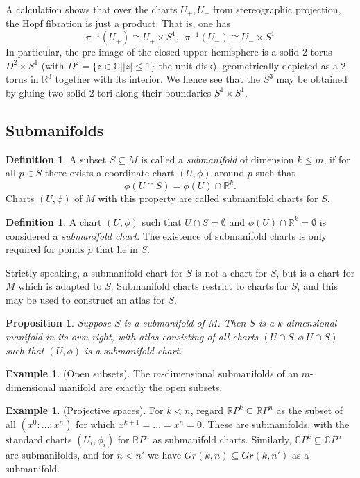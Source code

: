 \documentclass{article}
\newtheorem{proposition}{Proposition}[theorem]
\theoremstyle{definition}
\newtheorem{defn}[theorem]{Definition}
\newtheorem{example}[theorem]{Example}
\newenvironment{definition}
  {\vspace{8pt}\begin{mdframed}[backgroundcolor=blueish,innertopmargin=4]\begin{defn}}
  {\end{defn}\end{mdframed}\vspace{4pt}}
\begin{document}
A calculation shows that over the charts $U_+,U_-$ from stereographic projection, the Hopf fibration is just a product. That is, one has
\[
    \pi^{-1} (U_+) \cong U_+ \times S^1, \ \ \pi^{-1} (U_-) \cong U_- \times S^1
\]
In particular, the pre-image of the closed upper hemisphere is a solid 2-torus $D^2 \times S^1$ (with $D^2 = \{ z \in \mathbb C| |z| \leq 1 \}$ the unit disk), geometrically depicted as a 2-torus in $\mathbb R^3$ together with its interior. We hence see that the $S^3$ may be obtained by gluing two solid 2-tori along their boundaries $S^1 \times S^1$.

\subsection{Submanifolds}
\begin{definition}
A subset $S \subseteq M$ is called a \textit{submanifold} of dimension $k \leq m$, if for all $p \in S$ there exists a coordinate chart $(U,\phi)$ around $p$ such that
\[
    \phi(U \cap S) = \phi(U) \cap \mathbb R^k .
\] 
Charts $(U,\phi)$ of $M$ with this property are called submanifold charts for $S$.
\end{definition}

\begin{definition}
A chart $(U, \phi)$ such that $U \cap S = \emptyset$ and $\phi (U) \cap \mathbb R^k = \emptyset$ is considered a \textit{submanifold chart}. The existence of submanifold charts is only required for points $p$ that lie in $S$. 
\end{definition}

Strictly speaking, a submanifold chart for $S$ is not a chart for $S$, but is a chart for $M$ which is adapted to $S$. Submanifold charts restrict to charts for $S$, and this may be used to construct an atlas for $S$.

\begin{proposition}
Suppose $S$ is a submanifold of $M$. Then $S$ is a $k$-dimensional manifold in its own right, with atlas consisting of all charts $(U \cap S, \phi|U \cap S)$ such that $(U,\phi)$ is a submanifold chart.
\end{proposition}

\begin{example} (Open subsets). The $m$-dimensional submanifolds of an $m$-dimensional manifold are exactly the open subsets.
\end{example}

\begin{example} (Projective spaces). For $k < n$, regard $\mathbb R P^k \subseteq \mathbb R P^n$ as the subset of all  $(x^0 : \dots : x^n )$ for which $x^{k+1} = \dots = x^n = 0$. These are submanifolds, with the standard charts $(U_i ,\phi_i)$ for $\mathbb R P^n$ as submanifold charts. Similarly, $\mathbb C P^k \subseteq \mathbb C P^n$ are submanifolds, and for $n < n'$ we have $Gr(k,n) \subseteq Gr(k,n')$ as a submanifold.

\end{example}
\end{document}
